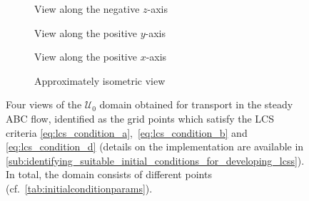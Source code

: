\begin{figure}[htpb]
    \centering
    \begin{subfigure}[b]{0.475\textwidth}
        \centering
        \caption[]{{\small View along the negative $z$-axis}}
        \label{fig:steady_abd_z}
    \end{subfigure}
    \begin{subfigure}[b]{0.475\textwidth}
        \centering
        \caption[]{{\small View along the positive $y$-axis}}
        \label{fig:steady_abd_y}
    \end{subfigure}

    \begin{subfigure}[b]{0.475\textwidth}
        \centering
        \caption[]{{\small View along the positive $x$-axis}}
        \label{fig:steady_abd_x}
    \end{subfigure}
    \begin{subfigure}[b]{0.475\textwidth}
        \centering
        \caption[]{{\small Approximately isometric view}}
        \label{fig:steady_abd_isometric}
    \end{subfigure}
    \caption[Four views of the $\mathcal{U}_{0}$ domain obtained for transport
    in the steady ABC flow]
    {
        Four views of the $\mathcal{U}_{0}$ domain obtained for transport in the
        steady ABC flow, identified as the grid points which satisfy the LCS
        criteria \eqref{eq:lcs_condition_a},~\eqref{eq:lcs_condition_b} and~
        \eqref{eq:lcs_condition_d} (details on the implementation are available
        in
        \cref{sub:identifying_suitable_initial_conditions_for_developing_lcss}).
        In total, the domain consists of  different points
        (cf.\ \cref{tab:initialconditionparams}).
}
    \label{fig:steady_abd}
\end{figure}

